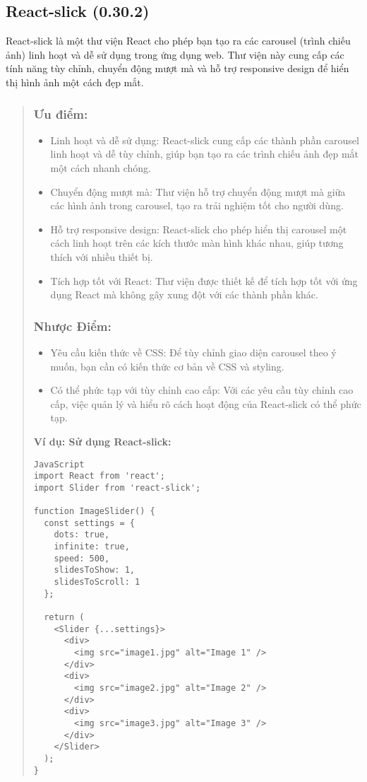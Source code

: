 \subsection{React-slick (0.30.2)}

React-slick là một thư viện React cho phép bạn tạo ra các carousel (trình chiếu ảnh) linh hoạt và dễ sử dụng trong ứng dụng web. Thư viện này cung cấp các tính năng tùy chỉnh, chuyển động mượt mà và hỗ trợ responsive design để hiển thị hình ảnh một cách đẹp mắt.

\begin{quote}
\subsubsection{Ưu điểm:}
\begin{itemize}
  \item Linh hoạt và dễ sử dụng: React-slick cung cấp các thành phần carousel linh hoạt và dễ tùy chỉnh, giúp bạn tạo ra các trình chiếu ảnh đẹp mắt một cách nhanh chóng.
  \item Chuyển động mượt mà: Thư viện hỗ trợ chuyển động mượt mà giữa các hình ảnh trong carousel, tạo ra trải nghiệm tốt cho người dùng.
  \item Hỗ trợ responsive design: React-slick cho phép hiển thị carousel một cách linh hoạt trên các kích thước màn hình khác nhau, giúp tương thích với nhiều thiết bị.
  \item Tích hợp tốt với React: Thư viện được thiết kế để tích hợp tốt với ứng dụng React mà không gây xung đột với các thành phần khác.
\end{itemize}

\subsubsection{Nhược Điểm:}
\begin{itemize}
  \item Yêu cầu kiến thức về CSS: Để tùy chỉnh giao diện carousel theo ý muốn, bạn cần có kiến thức cơ bản về CSS và styling.
  \item Có thể phức tạp với tùy chỉnh cao cấp: Với các yêu cầu tùy chỉnh cao cấp, việc quản lý và hiểu rõ cách hoạt động của React-slick có thể phức tạp.
\end{itemize}

\textbf{Ví dụ: Sử dụng React-slick:}
\begin{lstlisting}
JavaScript
import React from 'react';
import Slider from 'react-slick';

function ImageSlider() {
  const settings = {
    dots: true,
    infinite: true,
    speed: 500,
    slidesToShow: 1,
    slidesToScroll: 1
  };

  return (
    <Slider {...settings}>
      <div>
        <img src="image1.jpg" alt="Image 1" />
      </div>
      <div>
        <img src="image2.jpg" alt="Image 2" />
      </div>
      <div>
        <img src="image3.jpg" alt="Image 3" />
      </div>
    </Slider>
  );
}
\end{lstlisting}
\end{quote}

